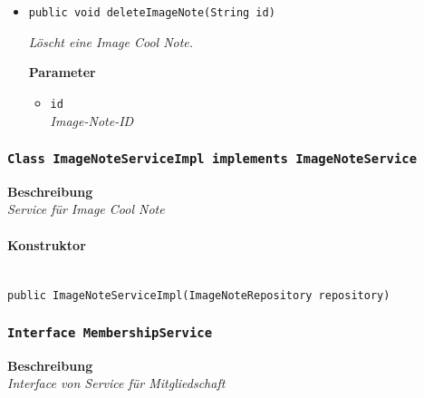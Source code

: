 \begin{itemize}
     \item{\texttt{public void deleteImageNote(String id)}}
     	
     	\textit{Löscht eine Image Cool Note.}
     	
     	\textbf{Parameter}
     	\begin{itemize}
     		\item\texttt{id}\\
     		\textit{Image-Note-ID}
     	\end{itemize}
     \end{itemize}
 
     \subsubsection{\texttt{Class ImageNoteServiceImpl implements ImageNoteService}}
     \textbf{Beschreibung} \\
     \textit{Service für Image Cool Note}
     \paragraph*{Konstruktor}\mbox{} \\
     \texttt{public ImageNoteServiceImpl(ImageNoteRepository repository)}
     \subsubsection{\texttt{Interface MembershipService}}
     \textbf{Beschreibung} \\
     \textit{Interface von Service für Mitgliedschaft}
